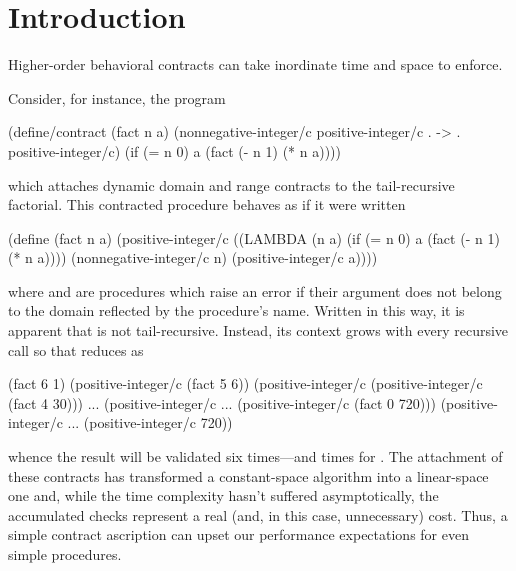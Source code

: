 \section{Introduction}

Higher-order behavioral contracts can take inordinate time and space to enforce.



Consider, for instance, the program
\begin{schemedisplay}
(define/contract (fact n a)
  (nonnegative-integer/c positive-integer/c . -> . positive-integer/c)
  (if (= n 0)
      a
      (fact (- n 1) (* n a))))
\end{schemedisplay}
which attaches dynamic domain and range contracts to the tail-recursive factorial.
This contracted procedure behaves as if it were written
\begin{schemedisplay}
(define (fact n a)
  (positive-integer/c
   ((LAMBDA (n a)
      (if (= n 0)
          a
          (fact (- n 1) (* n a))))
    (nonnegative-integer/c n)
    (positive-integer/c a))))
\end{schemedisplay}
where  and  are procedures which raise an error if their argument does not belong to the domain reflected by the procedure's name.
Written in this way, it is apparent that  is not tail-recursive.
Instead, its context grows with every recursive call so that  reduces as
\begin{schemedisplay}
(fact 6 1)
(positive-integer/c (fact 5 6))
(positive-integer/c (positive-integer/c (fact 4 30)))
...
(positive-integer/c ... (positive-integer/c (fact 0 720)))
(positive-integer/c ... (positive-integer/c 720))
\end{schemedisplay}
whence the result will be validated six times---and  times for .
The attachment of these contracts has transformed a constant-space algorithm into a linear-space one and, while the time complexity hasn't suffered asymptotically, the accumulated checks represent a real (and, in this case, unnecessary) cost.
Thus, a simple contract ascription can upset our performance expectations for even simple procedures.

